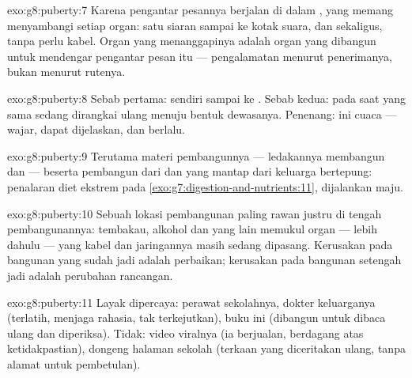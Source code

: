 \begin{solution}{exo:g8:puberty:7}
Karena pengantar pesannya berjalan di dalam , yang
memang menyambangi setiap organ: satu siaran sampai ke kotak
suara,  dan  sekaligus, tanpa perlu kabel. Organ
yang menanggapinya adalah organ yang dibangun untuk mendengar
pengantar pesan itu --- pengalamatan menurut penerimanya,
bukan menurut rutenya.
\end{solution}

\begin{solution}{exo:g8:puberty:8}
Sebab pertama:   sendiri sampai ke .
Sebab kedua:  pada saat yang sama sedang dirangkai
ulang menuju bentuk dewasanya. Penenang: ini cuaca --- wajar,
dapat dijelaskan, dan berlalu.
\end{solution}

\begin{solution}{exo:g8:puberty:9}
Terutama materi pembangunnya --- ledakannya membangun 
dan  --- beserta pembangun  dari  dan 
yang mantap dari keluarga bertepung: penalaran diet ekstrem
pada \cref{exo:g7:digestion-and-nutrients:11}, dijalankan maju.
\end{solution}

\begin{solution}{exo:g8:puberty:10}
Sebuah lokasi pembangunan paling rawan justru di tengah
pembangunannya: tembakau, alkohol dan yang lain memukul organ
---  lebih dahulu --- yang kabel dan jaringannya masih
sedang dipasang. Kerusakan pada bangunan yang sudah jadi
adalah perbaikan; kerusakan pada bangunan setengah jadi
adalah perubahan rancangan.
\end{solution}

\begin{solution}{exo:g8:puberty:11}
Layak dipercaya: perawat sekolahnya, dokter keluarganya
(terlatih, menjaga rahasia, tak terkejutkan), buku ini
(dibangun untuk dibaca ulang dan diperiksa). Tidak: video
viralnya (ia berjualan, berdagang atas ketidakpastian),
dongeng halaman sekolah (terkaan yang diceritakan ulang,
tanpa alamat untuk pembetulan).
\end{solution}

